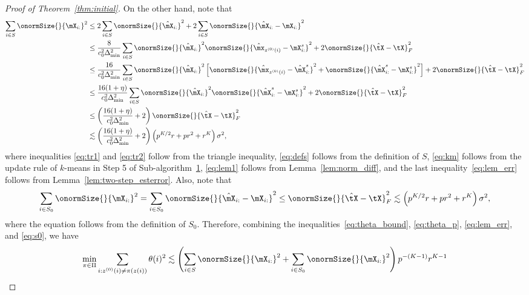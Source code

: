 \documentclass[lettersize,onecolumn,journal]{IEEEtran}
\theoremstyle{definition}
\theoremstyle{definition}
\newcommand{\of}[1]{\left(#1\right)}
\newcommand{\off}[1]{\left[#1\right]}
\begin{document}
\begin{proof}[Proof of Theorem~\ref{thm:initial}]
    On the other hand, note that 
    \begin{align}
         \sum_{i \in S} \onormSize{}{\mX_{i:}}^2 & \leq 2 \sum_{i \in S} \onormSize{}{\hat \mX_{i:}}^2  +  2\sum_{i \in S} \onormSize{}{\hat \mX_{i:} - \mX_{i:}}^2 \label{eq:tr1}\\
         & \leq \frac{8}{c_0^2 \Delta_{\min}^2  } \sum_{i \in S} \onormSize{}{\hat \mX_{i:}}^2   \onormSize{}{\hat \mx_{z^{(0)}(i)} - \mX_{i:}^s }^2 +2 \onormSize{}{\hat \tX - \tX}_F^2 \label{eq:defs} \\
         & \leq \frac{16}{c_0^2 \Delta_{\min}^2  }\sum_{i \in S} \onormSize{}{\hat \mX_{i:}}^2  \off{ \onormSize{}{\hat \mx_{z^{(0)}(i)} - \hat \mX_{i:}^s }^2 + \onormSize{}{\hat \mX_{i:}^s - \mX_{i:}^s }^2 } + 2\onormSize{}{\hat \tX - \tX}_F^2 \label{eq:tr2} \\
         & \leq  \frac{16(1 + \eta)}{c_0^2 \Delta_{\min}^2 }\sum_{i \in S} \onormSize{}{\hat \mX_{i:}}^2  \onormSize{}{\hat \mX_{i:}^s - \mX_{i:}^s }^2  + 2\onormSize{}{\hat \tX - \tX}_F^2 \label{eq:km} \\
         & \leq \of{ \frac{16(1 + \eta)}{c_0^2 \Delta_{\min}^2 } + 2 }\onormSize{}{\hat \tX - \tX}_F^2 \label{eq:lem1}\\
         & \lesssim \of{ \frac{16(1 + \eta)}{c_0^2 \Delta_{\min}^2 } + 2 } \of{ p^{K/2}r + pr^2 + r^K } \sigma^2 \label{eq:lem_err},
    \end{align}
    where inequalities \eqref{eq:tr1} and \eqref{eq:tr2} follow from the triangle inequality, \eqref{eq:defs} follows from the definition of $S$, \eqref{eq:km} follows from the update rule of $k$-means in Step 5 of Sub-algorithm~\hyperref[alg:main]{1}, \eqref{eq:lem1} follows from Lemma~\ref{lem:norm_diff}, and the last inequality~\eqref{eq:lem_err} follows from Lemma~\ref{lem:two-step_esterror}. Also, note that 
    \begin{equation}\label{eq:s0}
         \sum_{i \in S_0} \onormSize{}{\mX_{i:}}^2 =  \sum_{i \in S_0} \onormSize{}{\hat \mX_{i:}- \mX_{i:}}^2 \leq \onormSize{}{\hat \tX - \tX}_F^2 \lesssim \of{ p^{K/2}r + pr^2 + r^K } \sigma^2,
    \end{equation}
    where the equation follows from the definition of $S_0$. Therefore, combining the inequalities~\eqref{eq:theta_bound}, \eqref{eq:theta_p}, \eqref{eq:lem_err}, and \eqref{eq:s0}, we have 
    \begin{align}\label{eq:theta_sum}
        \min_{\pi \in \Pi} \sum_{i : z^{(0)}(i) \neq \pi(z(i))} \theta(i)^2  &\lesssim \of{\sum_{i \in S} \onormSize{}{\mX_{i:}}^2 + \sum_{i \in S_0} \onormSize{}{\mX_{i:}}^2  } p^{-(K-1)} r^{K-1} \\

\end{align}
\end{proof}
\end{document}
